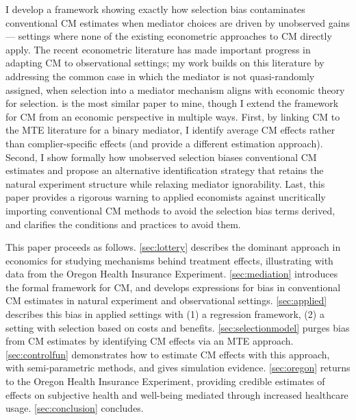 I develop a framework showing exactly how selection bias contaminates conventional CM estimates when mediator choices are driven by unobserved gains --- settings where none of the existing econometric approaches to CM directly apply.
The recent econometric literature has made important progress in adapting CM to observational settings;
my work builds on this literature by addressing the common case in which the mediator is not quasi-randomly assigned, when selection into a mediator mechanism aligns with economic theory for selection.
\cite{frolich2017direct} is the most similar paper to mine, though I extend the framework for CM from an economic perspective in multiple ways.
First, by linking CM to the MTE literature for a binary mediator, I identify average CM effects rather than complier-specific effects (and provide a different estimation approach).
Second, I show formally how unobserved selection biases conventional CM estimates and propose an alternative identification strategy that retains the natural experiment structure while relaxing mediator ignorability.
Last, this paper provides a rigorous warning to applied economists against uncritically importing conventional CM methods to avoid the selection bias terms derived, and clarifies the conditions and practices to avoid them.

This paper proceeds as follows.
\autoref{sec:lottery} describes the dominant approach in economics for studying mechanisms behind treatment effects, illustrating with data from the Oregon Health Insurance Experiment.
\autoref{sec:mediation} introduces the formal framework for CM, and develops expressions for bias in conventional CM estimates in natural experiment and observational settings.
\autoref{sec:applied} describes this bias in applied settings with (1) a regression framework, (2) a setting with selection based on costs and benefits.
\autoref{sec:selectionmodel} purges bias from CM estimates by identifying CM effects via an MTE approach.
\autoref{sec:controlfun} demonstrates how to estimate CM effects with this approach, with semi-parametric methods, and gives simulation evidence.
\autoref{sec:oregon} returns to the Oregon Health Insurance Experiment, providing credible estimates of effects on subjective health and well-being mediated through increased healthcare usage.
\autoref{sec:conclusion} concludes.
